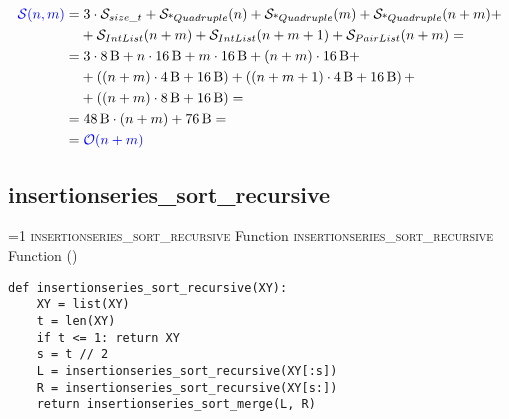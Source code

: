         \begin{frame}{\insertionseriessortmergecostframe}
            \begin{align*}
                \textcolor{blue}{\mathcal{S}{\left(n, m\right)}} = & \; 3 \cdot \mathcal{S}_{size\_t} + \mathcal{S}_{\text{*}Quadruple}{\left(n\right)} + \mathcal{S}_{\text{*}Quadruple}{\left(m\right)} + \mathcal{S}_{\text{*}Quadruple}{\left(n + m\right)} + \\
                & + \mathcal{S}_{IntList}{\left(n + m\right)} + \mathcal{S}_{IntList}{\left(n + m + 1\right)} + \mathcal{S}_{PairList}{\left(n + m\right)} = \\
                = & \; 3 \cdot \SI{8}{B} + n \cdot \SI{16}{B} + m \cdot \SI{16}{B} + \left(n + m\right) \cdot \SI{16}{B} + \\
                & + \left(\left(n + m\right) \cdot \SI{4}{B} + \SI{16}{B}\right) + \left(\left(n + m + 1\right) \cdot \SI{4}{B} + \SI{16}{B}\right) + \\
                & + \left(\left(n + m\right) \cdot \SI{8}{B} + \SI{16}{B}\right) = \\
                = & \; \SI{48}{B} \cdot \left(n + m\right) + \SI{76}{B} = \\
                = & \; \textcolor{blue}{\mathcal{O}{\left(n + m\right)}}
            \end{align*}
        \end{frame}

    \subsection{insertionseries\_sort\_recursive}
\setcounter{insertionseriessortrecursivefunctioncounter}{1}
\newcommand{\insertionseriessortrecursivefunctionframe}{%
    \ifnum\value{insertionseriessortrecursivefunctioncounter}=1
        \textsc{insertionseries\_sort\_recursive} Function%
    \else
        \textsc{insertionseries\_sort\_recursive} Function (\theinsertionseriessortrecursivefunctioncounter)%
    \fi
}
        \begin{frame}[containsverbatim]{\insertionseriessortrecursivefunctionframe}
            \begin{verbatim}
def insertionseries_sort_recursive(XY):
    XY = list(XY)
    t = len(XY)
    if t <= 1: return XY
    s = t // 2
    L = insertionseries_sort_recursive(XY[:s])
    R = insertionseries_sort_recursive(XY[s:])
    return insertionseries_sort_merge(L, R)
                \end{verbatim}
        \end{frame}

